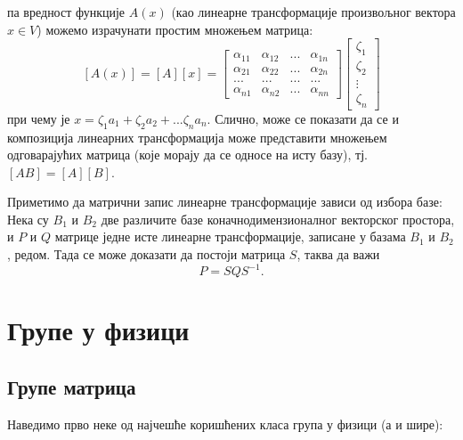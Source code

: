\documentclass{report}
\theoremstyle{plain}
\theoremstyle{definition}
\begin{document}
па вредност функције $A(x)$ (као линеарне трансформације произвољног вектора $x\in V$) можемо израчунати простим множењем матрица:
$$[A(x)] = [A][x] = \begin{bmatrix}
            \alpha_{11} & \alpha_{12} & ... & \alpha_{1n} \\
            \alpha_{21} & \alpha_{22} & ... & \alpha_{2n} \\
            ... & ... & ... & ... \\
            \alpha_{n1} & \alpha_{n2} & ... & \alpha_{nn}
           \end{bmatrix}
           \begin{bmatrix}
           \zeta_1\\
           \zeta_2\\
           \vdots \\
           \zeta_n
           \end{bmatrix}
$$
при чему је $x = \zeta_1 a_1 + \zeta_2 a_2 + ... \zeta_n a_n$. Слично, може се показати да се и композиција линеарних трансформација може представити множењем одговарајућих матрица (које морају да се односе на исту базу), тј. $[AB] = [A][B]$.

Приметимо да матрични запис линеарне трансформације зависи од избора базе:\\
Нека су $B_1$ и $B_2$ две различите базе коначнодимензионалног векторског простора, и $P$ и $Q$ матрице једне исте линеарне трансформације, записане у базама $B_1$ и $B_2$, редом. Тада се може доказати да постоји матрица $S$, таква да важи
$$P = SQS^{-1}.$$

\chapter{Групе у физици}

\section{Групе матрица}

Наведимо прво неке од најчешће коришћених класа група у физици (а и шире):
\end{document}
